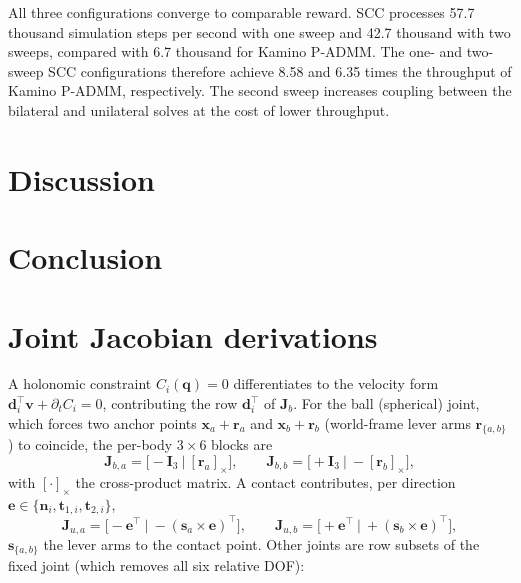 \documentclass{article}
\newcommand{\Jac}{\mathbf{J}}
\newcommand{\vv}{\mathbf{v}}
\newcommand{\Id}{\mathbf{I}}
\newcommand{\skewm}[1]{[#1]_{\times}}    %
\theoremstyle{plain}
\theoremstyle{definition}
\begin{document}
All three configurations converge to comparable reward. SCC processes 57.7
thousand simulation steps per second with one sweep and 42.7 thousand with two
sweeps, compared with 6.7 thousand for Kamino P-ADMM. The one- and two-sweep
SCC configurations therefore achieve 8.58 and 6.35 times the throughput of
Kamino P-ADMM, respectively. The second sweep increases coupling between the
bilateral and unilateral solves at the cost of lower throughput.
\FloatBarrier

\section{Discussion}
\label{sec:discussion}

\section{Conclusion}
\label{sec:conclusion}

\appendix

\section{Joint Jacobian derivations}
\label{app:jacobians}
A holonomic constraint $C_i(\mathbf q)=0$ differentiates to the velocity form
$\mathbf d_i^{\top}\vv+\partial_t C_i=0$, contributing the row $\mathbf d_i^{\top}$
of $\Jac_b$. For the ball (spherical) joint, which forces two anchor points
$\mathbf x_a+\mathbf r_a$ and $\mathbf x_b+\mathbf r_b$ (world-frame lever arms
$\mathbf r_{\{a,b\}}$) to coincide, the per-body $3\times6$ blocks are
\begin{equation}
\Jac_{b,a}=\bigl[-\Id_3\ \big|\ \skewm{\mathbf r_a}\bigr],\qquad
\Jac_{b,b}=\bigl[+\Id_3\ \big|\ -\skewm{\mathbf r_b}\bigr],
\end{equation}
with $\skewm{\cdot}$ the cross-product matrix. A contact contributes, per
direction $\mathbf e\in\{\mathbf n_i,\mathbf t_{1,i},\mathbf t_{2,i}\}$,
\begin{equation}
\Jac_{u,a}=\bigl[-\mathbf e^{\top}\ \big|\ -(\mathbf s_{a}\times\mathbf e)^{\top}\bigr],\qquad
\Jac_{u,b}=\bigl[+\mathbf e^{\top}\ \big|\ +(\mathbf s_{b}\times\mathbf e)^{\top}\bigr],
\end{equation}
$\mathbf s_{\{a,b\}}$ the lever arms to the contact point. Other joints are row
subsets of the fixed joint (which removes all six relative DOF):
\end{document}
